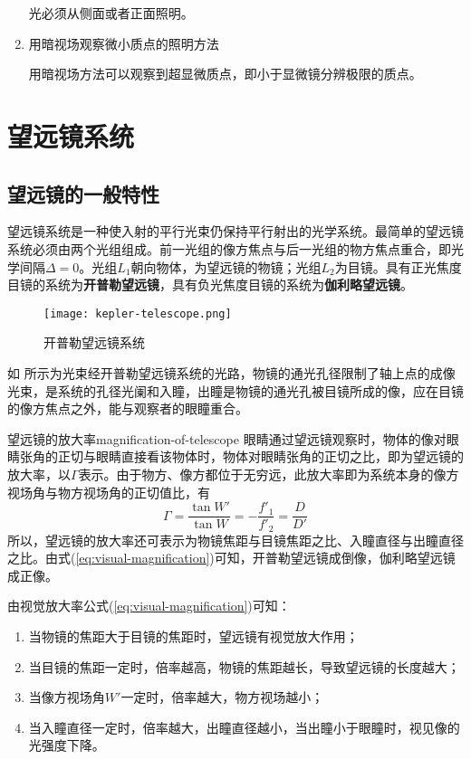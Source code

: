 \documentclass[cn,10pt,chinesefont=founder,math=newtx,cite=super,twoside]{elegantbook}
\begin{document}
\begin{enumerate}
	光必须从侧面或者正面照明。
	\item 用暗视场观察微小质点的照明方法
	
	用暗视场方法可以观察到超显微质点，即小于显微镜分辨极限的质点。
\end{enumerate}

\section{望远镜系统}
\label{sec:telescope}
\subsection{望远镜的一般特性}
望远镜系统是一种使入射的平行光束仍保持平行射出的光学系统。最简单的望远镜系统必须由两个光组组成。前一光组的像方焦点与后一光组的物方焦点重合，即光学间隔$\varDelta=0$。光组$L_1$朝向物体，为望远镜的物镜；光组$L_2$为目镜。具有正光焦度目镜的系统为\textbf{开普勒望远镜}，具有负光焦度目镜的系统为\textbf{伽利略望远镜}。

\begin{figure}[htbp]
	\centering
	\texttt{[image: kepler-telescope.png]}
	\caption{开普勒望远镜系统}
	\label{fig:kepler-telescope}
\end{figure}

如 所示为光束经开普勒望远镜系统的光路，物镜的通光孔径限制了轴上点的成像光束，是系统的孔径光阑和入瞳，出瞳是物镜的通光孔被目镜所成的像，应在目镜的像方焦点之外，能与观察者的眼瞳重合。

\begin{definition}{望远镜的放大率}{magnification-of-telescope}
	眼睛通过望远镜观察时，物体的像对眼睛张角的正切与眼睛直接看该物体时，物体对眼睛张角的正切之比，即为望远镜的放大率，以$\varGamma$表示。由于物方、像方都位于无穷远，此放大率即为系统本身的像方视场角与物方视场角的正切值比，有
	\begin{equation}
	\varGamma=\frac{\tan W'}{\tan W}=-\frac{f'_1}{f'_2}=\frac{D}{D'}
	\label{eq:visual-magnification}
	\end{equation}
	所以，望远镜的放大率还可表示为物镜焦距与目镜焦距之比、入瞳直径与出瞳直径之比。由式(\ref{eq:visual-magnification})可知，开普勒望远镜成倒像，伽利略望远镜成正像。
\end{definition}

\begin{property}
由视觉放大率公式(\ref{eq:visual-magnification})可知：
\begin{enumerate}
	\item 当物镜的焦距大于目镜的焦距时，望远镜有视觉放大作用；
	\item 当目镜的焦距一定时，倍率越高，物镜的焦距越长，导致望远镜的长度越大；
	\item 当像方视场角$W'$一定时，倍率越大，物方视场越小；
	\item 当入瞳直径一定时，倍率越大，出瞳直径越小，当出瞳小于眼瞳时，视见像的光强度下降。
\end{enumerate}
\end{property}
\end{document}
